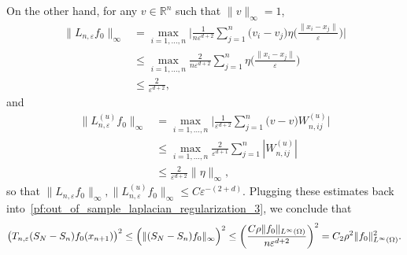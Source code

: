 \documentclass{article}
\newcommand{\Reals}{\mathbb{R}}
\newcommand{\1}{\mathbf{1}}
\theoremstyle{alden}
\theoremstyle{aldenthm}
\theoremstyle{definition}
\theoremstyle{remark}
\begin{document}
On the other hand, for any $v \in \Reals^n$ such that $\|v\|_{\infty} = 1$,
\begin{align*}
\|L_{n,\varepsilon}f_0\|_{\infty} & = \max_{i = 1,\ldots,n} \biggl| \frac{1}{n\varepsilon^{d + 2}}\sum_{j = 1}^{n} \bigl(v_i - v_j\bigr) \eta\biggl(\frac{\|x_i - x_j\|}{\varepsilon}\biggr) \biggr| \\
& \leq \max_{i = 1,\ldots,n}  \frac{2}{n\varepsilon^{d + 2}}\sum_{j = 1}^{n} \eta\biggl(\frac{\|x_i - x_j\|}{\varepsilon}\biggr) \\
& \leq \frac{2}{\varepsilon^{d + 2}},
\end{align*}
and
\begin{align*}
\|L_{n,\varepsilon}^{(u)}f_0\|_{\infty} & = \max_{i = 1,\ldots,n} \biggl| \frac{1}{\varepsilon^{d + 2}} \sum_{j = 1}^{n} \bigl(v - v\bigr) W_{n,ij}^{(u)}\biggr| \\
& \leq \max_{i = 1,\ldots,n} \frac{2}{\varepsilon^{d + 1}} \sum_{j = 1}^{n} |W_{n,ij}^{(u)}|\\
& \leq \frac{2}{\varepsilon^{d + 2}} \|\eta\|_{\infty},
\end{align*}
so that $\|L_{n,\varepsilon}f_0\|_{\infty}, \|L_{n,\varepsilon}^{(u)}f_0\|_{\infty} \leq C\varepsilon^{-(2 + d)}$. Plugging these estimates back into~\eqref{pf:out_of_sample_laplacian_regularization_3}, we conclude that
\begin{equation*}
\bigl(T_{n,\varepsilon}(S_N - S_n)f_0(x_{n + 1})\bigr)^2 \leq \Bigl(\|(S_N - S_n)f_0\|_{\infty}\Bigr)^2 \leq \biggl(\frac{C\rho\|f_0\|_{L^{\infty}(\Omega)}}{n\varepsilon^{d + 2}}\biggr)^2 = C_2\rho^2\|f_0\|_{L^{\infty}(\Omega)}^2.
\end{equation*}
\end{document}
